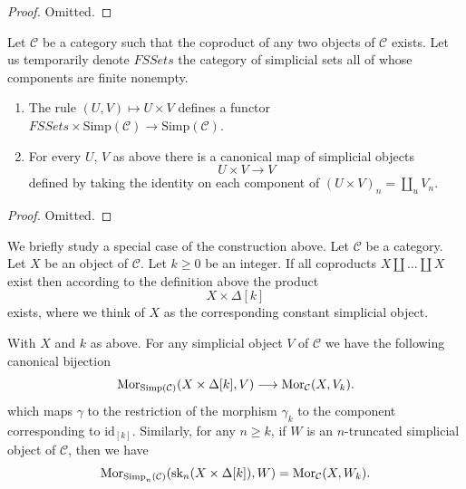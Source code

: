 \begin{proof}
Omitted.
\end{proof}

\begin{lemma}
\label{lemma-back-to-U}
Let $\mathcal{C}$ be a category such that the coproduct of
any two objects of $\mathcal{C}$ exists. Let us temporarily
denote $\textit{FSSets}$ the category of simplicial sets
all of whose components are finite nonempty.
\begin{enumerate}
\item The rule $(U, V) \mapsto U \times V$
defines a functor
$\textit{FSSets} \times \text{Simp}(\mathcal{C})
\to \text{Simp}(\mathcal{C})$.
\item For every $U$, $V$ as above
there is a canonical map of simplicial objects
$$
U \times V \longrightarrow V
$$
defined by taking the identity on each component of
$(U \times V)_n = \coprod_u V_n$.
\end{enumerate}
\end{lemma}

\begin{proof}
Omitted.
\end{proof}

\noindent
We briefly study a special case of the construction
above. Let $\mathcal{C}$ be a category.
Let $X$ be an object of $\mathcal{C}$.
Let $k \geq 0$ be an integer.
If all coproducts $X \amalg \ldots \amalg X$ exist
then according to the definition above the product
$$
X \times \Delta[k]
$$
exists, where we think of $X$ as the corresponding constant
simplicial object.

\begin{lemma}
\label{lemma-morphism-from-coproduct}
With $X$ and $k$ as above.
For any simplicial object $V$ of
$\mathcal{C}$ we have the following
canonical bijection
$$
\mathop{\mathrm{Mor}}\nolimits_{\text{Simp}(\mathcal{C})}(X \times \Delta[k], V)
\longrightarrow
\mathop{\mathrm{Mor}}\nolimits_\mathcal{C}(X, V_k).
$$
which maps $\gamma$ to the restriction of the
morphism $\gamma_k$ to the component corresponding
to $\text{id}_{[k]}$.
Similarly, for any $n \geq k$, if $W$ is an
$n$-truncated simplicial object
of $\mathcal{C}$, then we have
$$
\mathop{\mathrm{Mor}}\nolimits_{\text{Simp}_n(\mathcal{C})}(\text{sk}_n(X \times \Delta[k]), W)
=
\mathop{\mathrm{Mor}}\nolimits_\mathcal{C}(X, W_k).
$$
\end{lemma}

